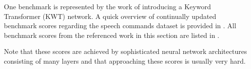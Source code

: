 One benchmark is represented by the work of \cite{Berg2021} introducing a Keyword Transformer (KWT) network.
A quick overview of continually updated benchmark scores regarding the speech commands dataset is provided in \cite{PaperswithcodeKWS}.
All benchmark scores from the referenced work in this section are listed in .

Note that these scores are achieved by sophisticated neural network architectures consisting of many layers and that approaching these scores is usually very hard.